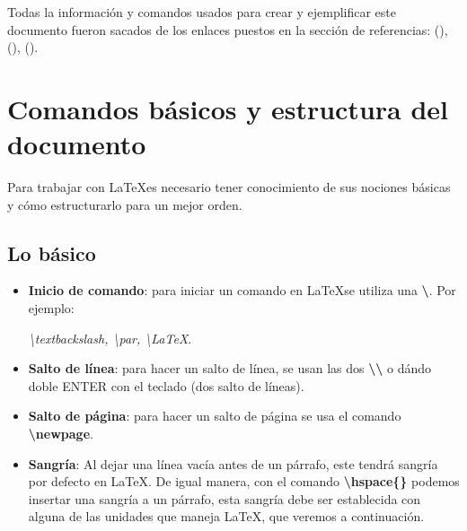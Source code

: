 
Todas la información y comandos usados para crear y ejemplificar este documento fueron sacados de los enlaces puestos en la sección de referencias: (\textit{\cite{trefor2}}), (\textit{\cite{trefor1}}), (\textit{\cite{overl}}).

\section{Comandos básicos y estructura del documento}
\hspace{0.55cm}Para trabajar con \LaTeX  es necesario tener conocimiento de sus nociones básicas y cómo estructurarlo para un mejor orden.


\subsection{Lo básico}
\begin{itemize}
    \item \textbf{Inicio de comando}: para iniciar un comando en \LaTeX  se utiliza una \textbf{\textbackslash}. Por ejemplo:
    \begin{center}
        \textit{\textbackslash{textbackslash}, \textbackslash{par}, \textbackslash{LaTeX}}.
    \end{center}
    \item \textbf{Salto de línea}: para hacer un salto de línea, se usan las dos \textbf{\textbackslash\textbackslash} o dándo doble ENTER con el teclado (dos salto de líneas).
    \item \textbf{Salto de página}: para hacer un salto de página se usa el comando \textbf{\textbackslash{newpage}}.
    \item \textbf{Sangría}: Al dejar una línea vacía antes de un párrafo, este tendrá sangría por defecto en \LaTeX. De igual manera, con el comando \textbf{\textbackslash{hspace\{\}}} podemos insertar una sangría a un párrafo, esta sangría debe ser establecida con alguna de las unidades que maneja \LaTeX, que veremos a continuación.
\end{itemize}


